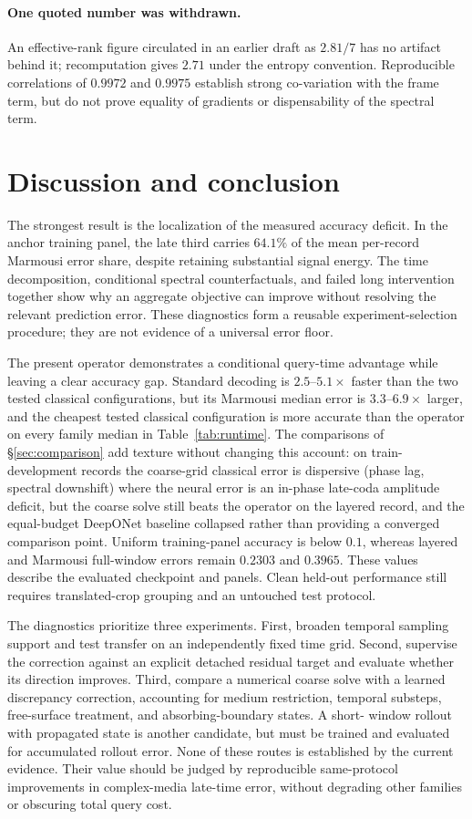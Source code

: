 \documentclass[11pt,a4paper]{article}
\begin{document}
\paragraph{One quoted number was withdrawn.} An effective-rank figure circulated in an earlier
draft as $2.81/7$ has no artifact behind it; recomputation gives $2.71$ under the entropy
convention. Reproducible correlations of $0.9972$ and $0.9975$ establish strong co-variation
with the frame term, but do not prove equality of gradients or dispensability of the spectral term.

\section{Discussion and conclusion}

The strongest result is the localization of the measured accuracy deficit. In the anchor
training panel, the late third carries $64.1\%$ of the mean per-record Marmousi error share,
despite retaining substantial signal energy. The time decomposition, conditional spectral
counterfactuals, and failed long intervention together show why an aggregate objective can
improve without resolving the relevant prediction error. These diagnostics form a reusable
experiment-selection procedure; they are not evidence of a universal error floor.

The present operator demonstrates a conditional query-time advantage while leaving a clear
accuracy gap. Standard decoding is $2.5$--$5.1\times$ faster than the two tested classical
configurations, but its Marmousi median error is $3.3$--$6.9\times$ larger, and the cheapest
tested classical configuration is more accurate than the operator on every family median in
Table~\ref{tab:runtime}. The comparisons of \S\ref{sec:comparison} add texture without
changing this account: on train-development records the coarse-grid classical error is
dispersive (phase lag, spectral downshift) where the neural error is an in-phase late-coda
amplitude deficit, but the coarse solve still beats the operator on the layered record, and
the equal-budget DeepONet baseline collapsed rather than providing a converged comparison
point. Uniform training-panel
accuracy is below $0.1$, whereas layered and Marmousi full-window errors remain $0.2303$ and
$0.3965$. These values describe the evaluated checkpoint and panels. Clean held-out performance
still requires translated-crop grouping and an untouched test protocol.

The diagnostics prioritize three experiments. First, broaden temporal sampling support and
test transfer on an independently fixed time grid. Second, supervise the correction against
an explicit detached residual target and evaluate whether its direction improves. Third,
compare a numerical coarse solve with a learned discrepancy correction, accounting for medium
restriction, temporal substeps, free-surface treatment, and absorbing-boundary states. A short-
window rollout with propagated state is another candidate, but must be trained and evaluated
for accumulated rollout error. None of these routes is established by the current evidence.
Their value should be judged by reproducible same-protocol improvements in complex-media
late-time error, without degrading other families or obscuring total query cost.
\end{document}
